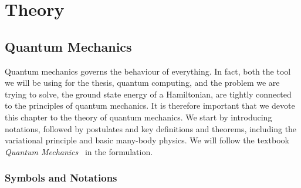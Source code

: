 \newcommand{\tr}[1]{\text{Tr}\left(#1\right)}

\part{Theory}
\label{part:theory}

\chapter{Quantum Mechanics}
\label{ch:qm}
Quantum mechanics governs the behaviour of everything. In fact, both the tool we will be using for the thesis, quantum computing, and the problem we are trying to solve, the ground state energy of a Hamiltonian, are tightly connected to the principles of quantum mechanics. It is therefore important that we devote this chapter to the theory of quantum mechanics. We start by introducing notations, followed by postulates and key definitions and theorems, including the variational principle and basic many-body physics. We will follow the textbook \textit{Quantum Mechanics}~\cite{schiff1968} in the formulation.
\section*{Symbols and Notations}
\label{sec:notations}

